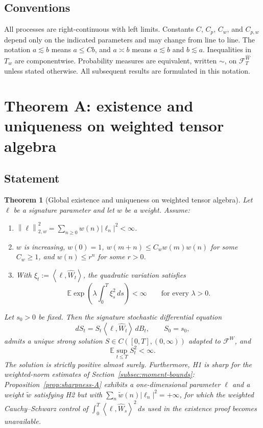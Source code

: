 \documentclass[11pt,oneside]{article}
\theoremstyle{plain}
\newtheorem{theorem}{Theorem}[section]
\theoremstyle{definition}
\theoremstyle{remark}
\newcommand{\E}{\mathbb{E}}
\newcommand{\Tw}{T_w}
\newcommand{\cW}{\widehat W}
\newcommand{\FWh}{\mathcal F^{\widehat W}}
\newcommand{\FW}{\mathcal F^W}
\newcommand{\norm}[1]{\left\lVert #1\right\rVert}
\newcommand{\abs}[1]{\left\lvert #1\right\rvert}
\newcommand{\inner}[2]{\left\langle #1,#2\right\rangle}
\begin{document}
\subsection{Conventions}

All processes are right-continuous with left limits. Constants $C$, $C_p$, $C_w$, and $C_{p,w}$ depend only on the indicated parameters and may change from line to line. The notation $a\lesssim b$ means $a\leq Cb$, and $a\asymp b$ means $a\lesssim b$ and $b\lesssim a$. Inequalities in $\Tw$ are componentwise. Probability measures are equivalent, written $\sim$, on $\FWh_T$ unless stated otherwise. All subsequent results are formulated in this notation.


\section{Theorem A: existence and uniqueness on weighted tensor algebra}\label{sec:theorem-a}

\subsection{Statement}

\begin{theorem}[Global existence and uniqueness on weighted tensor algebra]\label{thm:A}
Let $\ell$ be a signature parameter and let $w$ be a weight. Assume:
\begin{enumerate}[label=H\arabic*.]
\item $\displaystyle \norm{\ell}_{2,w}^2=\sum_{n\geq0}w(n)\abs{\ell_n}^2<\infty$.
\item $w$ is increasing, $w(0)=1$, $w(m+n)\leq C_w w(m)w(n)$ for some $C_w\geq1$, and $w(n)\leq r^n$ for some $r>0$.
\item With $\xi_t:=\inner{\ell}{\cW_t}$, the quadratic variation satisfies
\[
\E\exp\left(\lambda\int_0^T \xi_s^2\,ds\right)<\infty
\qquad\text{for every }\lambda>0.
\]
\end{enumerate}
Let $s_0>0$ be fixed. Then the signature stochastic differential equation
\[
dS_t=S_t\inner{\ell}{\cW_t}\,dB_t,
\qquad S_0=s_0,
\]
admits a unique strong solution $S\in C([0,T],(0,\infty))$ adapted to $\FW$, and
\[
\E\sup_{t\leq T}S_t^2<\infty.
\]
The solution is strictly positive almost surely. Furthermore, H1 is sharp for the weighted-norm estimates of Section~\ref{subsec:moment-bounds}: Proposition~\ref{prop:sharpness-A} exhibits a one-dimensional parameter $\ell$ and a weight $\widetilde w$ satisfying H2 but with $\sum_n\widetilde w(n)\abs{\ell_n}^2=+\infty$, for which the weighted Cauchy--Schwarz control of $\int_0^T\inner{\ell}{\cW_s}^2\,ds$ used in the existence proof becomes unavailable.
\end{theorem}
\end{document}
